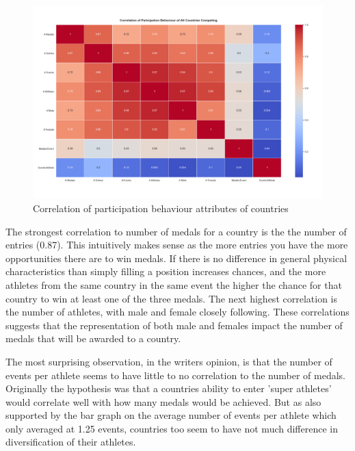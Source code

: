 \documentclass[a4 paper, 12pt]{article}
\begin{document}
        \begin{figure} [H]
            \centering
            \includegraphics[width=\textwidth, frame]
                {./images/graph/countries_stats_heatmap.png}      
                \caption{Correlation of participation behaviour attributes of countries } 
        \end{figure}

        The strongest correlation to number of medals for a country is the the number of entries (0.87). This intuitively makes sense as the more entries you have the more opportunities there are to win medals. If there is no difference in general physical characteristics than simply filling a position increases chances, and the more athletes from the same country in the same event the higher the chance for that country to win at least one of the three medals. The next highest correlation is the number of athletes, with male and female closely following. These correlations suggests that the representation of both male and females impact the number of medals that will be awarded to a country. 
        
        The most surprising observation, in the writers opinion, is that the number of events per athlete seems to have little to no correlation to the number of medals. Originally the hypothesis was that a countries ability to enter 'super athletes' would correlate well with how many medals would be achieved. But as also supported by the bar graph on the average number of events per athlete which only averaged at 1.25 events, countries too seem to have not much difference in diversification of their athletes.
\end{document}
